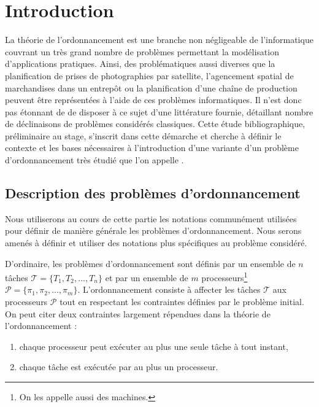 \documentclass[a4paper,11pt]{article}
\begin{document}

\newpage
\tableofcontents
\newpage

\section{Introduction}

La théorie de l'ordonnancement est une branche non négligeable de l'informatique couvrant un très
grand nombre de problèmes permettant la modélisation d'applications pratiques. Ainsi, des
problématiques aussi diverses que la planification de prises de photographies par satellite,
l'agencement spatial de marchandises dans un entrepôt ou la planification d'une chaîne de production
peuvent être représentées à l'aide de ces problèmes informatiques. Il n'est donc pas étonnant de
de disposer à ce sujet d'une littérature fournie, détaillant nombre de déclinaisons de problèmes
considérés classiques. Cette étude bibliographique, préliminaire au stage, s'inscrit dans cette
démarche et cherche à définir le contexte et les bases nécessaires à l'introduction d'une variante
d'un problème d'ordonnancement très étudié que l'on appelle \isched.

\subsection{Description des problèmes d'ordonnancement}

Nous utiliserons au cours de cette partie les notations communément utilisées pour définir de
manière générale les problèmes d'ordonnancement. Nous serons amenés à définir et utiliser des
notations plus spécifiques au problème considéré.

D'ordinaire, les problèmes d'ordonnancement sont définis par un ensemble de $n$ tâches $\mathcal{T} =
\{T_1, T_2, \dots, T_n\}$ et par un ensemble de $m$ processeurs\footnote{On les appelle aussi des
machines.} $\mathcal{P} = \{\pi_1, \pi_2, \dots, \pi_m\}$. L'ordonnancement consiste à affecter les
tâches $\mathcal{T}$ aux processeurs $\mathcal{P}$ tout en respectant les contraintes définies par
le problème initial. On peut citer deux contraintes largement répendues dans la théorie de
l'ordonnancement :
\begin{enumerate}
    \item chaque processeur peut exécuter au plus une seule tâche à tout instant,
    \item chaque tâche est exécutée par au plus un processeur.
\end{enumerate}
\end{document}
